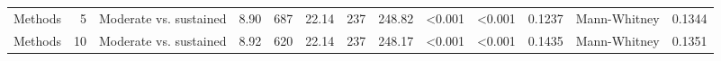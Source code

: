 \begin{table}[H]
{\begin{tabular}{l r p{4cm} c c c c r r r r l r}
Methods & 5 & Moderate vs. sustained &  8.90 & 687 & 22.14 & 237 & 248.82 & \textless 0.001 & \textless 0.001 & 0.1237 &  Mann-Whitney & 0.1344 \\ 
Methods & 10 & Moderate vs. sustained &  8.92 & 620 & 22.14 & 237 & 248.17 & \textless 0.001 & \textless 0.001 & 0.1435 &  Mann-Whitney & 0.1351 \\ 
\bottomrule
\end{tabular}%
} 
\label{tab:codebase_graph_latex_repository_graph_component_time_series_statistical_significance_test_normal} 
\end{table}
\newpage 
